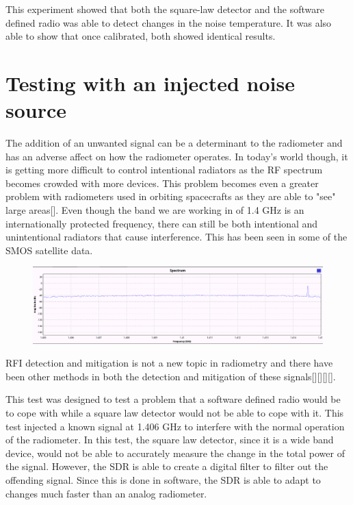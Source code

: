 This experiment showed that both the square-law detector and the software defined radio was able to detect changes in the noise temperature.  It was also able to show that once calibrated, both showed identical results.

\section{Testing with an injected noise source}
The addition of an unwanted signal can be a determinant to the radiometer and has an adverse affect on how the radiometer operates.  In today's world though, it is getting more difficult to control intentional radiators as the RF spectrum becomes crowded with more devices.  This problem becomes even a greater problem with radiometers used in orbiting spacecrafts as they are able to "see" large areas[\cite{DeRooRFI}].  Even though the band we are working in of 1.4 GHz is an internationally protected frequency, there can still be both intentional and unintentional radiators that cause interference.  This has been seen in some of the SMOS satellite data.

\begin{figure}[h!tb] \centering

\includegraphics[width=\textwidth]{Images/interfering_signal_edit.png}

\label{inter_signal}
\end{figure}

RFI detection and mitigation is not a new topic in radiometry and there have been other methods in both the detection and mitigation of these signals[\cite{Forte}][\cite{McIntyre_RFI}][\cite{DeRoo}][\cite{Ellingson}].

This test was designed to test a problem that a software defined radio would be to cope with while a square law detector would not be able to cope with it.  This test injected a known signal at 1.406 GHz to interfere with the normal operation of the radiometer.  In this test, the square law detector, since it is a wide band device, would not be able to accurately measure the change in the total power of the signal.  However, the SDR is able to create a digital filter to filter out the offending signal.  Since this is done in software, the SDR is able to adapt to changes much faster than an analog radiometer.

